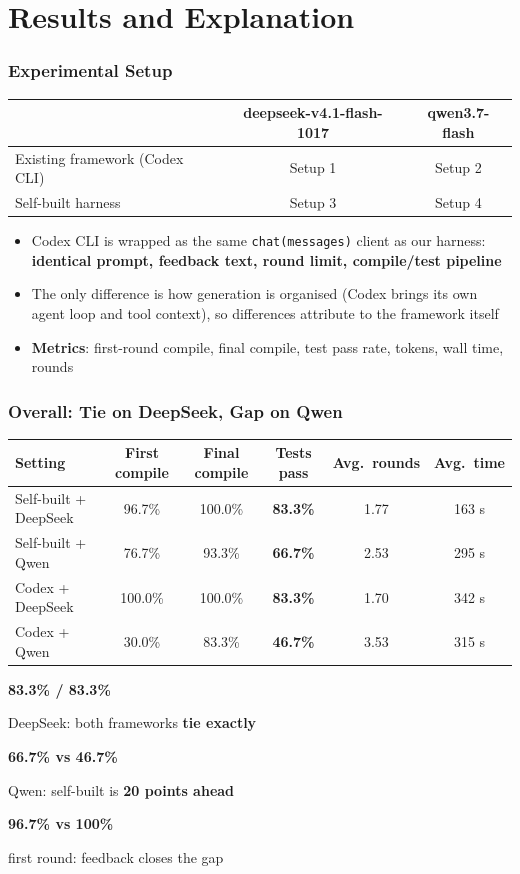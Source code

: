 \documentclass[10pt,aspectratio=169]{beamer}
\newcommand{\statbox}[2]{%
  \begin{minipage}[t]{0.31\linewidth}\centering
    {\color{blue!65!black}\bfseries\Large #1}\par\vspace{1pt}
    {\scriptsize #2}%
  \end{minipage}}
\begin{document}
\section{Results and Explanation}

\begin{frame}
  \frametitle{Experimental Setup}

  \centering
  \begin{tabular}{lcc}
    \hline
     & deepseek-v4.1-flash-1017 & qwen3.7-flash \\
    \hline
    Existing framework (Codex CLI) & Setup 1 & Setup 2 \\
    Self-built harness             & Setup 3 & Setup 4 \\
    \hline
  \end{tabular}

  \vspace{2.5mm}
  \begin{itemize}
    \item Codex CLI is wrapped as the same \texttt{chat(messages)} client as our
          harness: \textbf{identical prompt, feedback text, round limit,
          compile/test pipeline}
    \item The only difference is how generation is organised (Codex brings its
          own agent loop and tool context), so differences attribute to the
          framework itself
    \item \textbf{Metrics}: first-round compile, final compile, test pass rate,
          tokens, wall time, rounds
  \end{itemize}

\end{frame}

\begin{frame}
  \frametitle{Overall: Tie on DeepSeek, Gap on Qwen}

  \centering
  \small
  \setlength{\tabcolsep}{6pt}
  \renewcommand{\arraystretch}{1.25}
  \begin{tabular}{lccccc}
    \hline
    Setting & First compile & Final compile & Tests pass & Avg.\ rounds & Avg.\ time \\
    \hline
    Self-built + DeepSeek & 96.7\%  & 100.0\% & \textbf{83.3\%} & 1.77 & 163 s \\
    Self-built + Qwen     & 76.7\%  & 93.3\%  & \textbf{66.7\%} & 2.53 & 295 s \\
    Codex + DeepSeek      & 100.0\% & 100.0\% & \textbf{83.3\%} & 1.70 & 342 s \\
    \rowcolor{red!12}
    Codex + Qwen          & 30.0\%  & 83.3\%  & \textbf{46.7\%} & 3.53 & 315 s \\
    \hline
  \end{tabular}

  \vspace{2.5mm}
  \statbox{83.3\% / 83.3\%}{DeepSeek: both frameworks \textbf{tie exactly}}
  \hfill
  \statbox{66.7\% vs 46.7\%}{Qwen: self-built is \textbf{20 points ahead}}
  \hfill
  \statbox{96.7\% vs 100\%}{first round: feedback closes the gap}
\end{frame}
\end{document}
